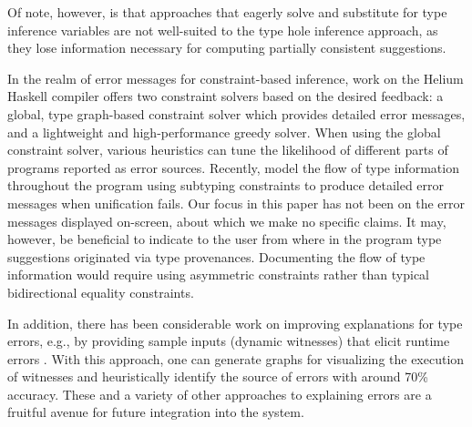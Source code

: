 Of note, however, is that approaches that eagerly solve and substitute for type inference variables \cite{odersky1999,pottier2014,mcadam1999} are not well-suited to the type hole inference approach, as they lose information necessary for computing partially consistent suggestions. 


In the realm of error messages for constraint-based inference, work on the Helium Haskell compiler \cite{heeren2003} offers two constraint solvers based on the desired feedback: a global, type graph-based constraint solver which provides detailed error messages, and a lightweight and high-performance greedy solver. When using the global constraint solver, various heuristics can tune the likelihood of different parts of programs reported as error sources.
Recently, \citet{bhanuka2023} model the flow of type information throughout the program using subtyping constraints to produce detailed error messages when unification fails.
Our focus in this paper has not been on the error messages displayed on-screen, about which we make no specific claims.
It may, however, be beneficial to indicate to the user from where in the program type suggestions originated via type provenances. Documenting the flow of type information would require using asymmetric constraints rather than typical bidirectional equality constraints. 

In addition, there has been considerable work on improving explanations for type errors, e.g., by providing sample inputs (dynamic witnesses) that elicit runtime errors \cite{seidel2016}. With this approach, one can generate graphs for visualizing the execution of witnesses and heuristically identify the source of errors with around 70\% accuracy.
These and a variety of other approaches to explaining errors are a fruitful avenue for future integration into the system.

